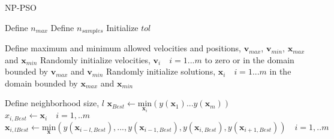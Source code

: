 \begin{breakablealgorithm}
\caption{NP-PSO}
\label{nppso_algorithm}
\begin{algorithmic}[1]
\State Define $n_{max}$ 
\State Define $n_{samples}$ 
\State Initialize $tol$  
\EndProcedure

\State Define maximum and minimum allowed velocities and positions, $\mathbf{v}_{max}$, $\mathbf{v}_{min}$, $\mathbf{x}_{max}$ and $\mathbf{x}_{min}$
\State Randomly initialize velocities, $\mathbf{v}_i \quad i=1...m$ to zero or in the domain bounded by $\mathbf{v}_{max}$ and $\mathbf{v}_{min}$
\State Randomly initialize solutions, $\mathbf{x}_i \quad i=1...m$ in the domain bounded by $\mathbf{x}_{max}$ and $\mathbf{x}_{min}$
\EndProcedure

\State Define neighborhood size, $l$
\State $\mathbf{x}_{Best} \leftarrow \underset{\mathbf{x}_i}{\textrm{min}}(y(\mathbf{x}_1)...y(\mathbf{x}_m))$
\State $x_{i,Best} \leftarrow \mathbf{x}_i \quad i=1,..m$
\State $\mathbf{x}_{i,lBest} \leftarrow \underset{\mathbf{x}}{\textrm{min}}(y(\mathbf{x}_{i-l,Best}),...,y(\mathbf{x}_{i-1,Best}),y(\mathbf{x}_{i,Best}),y(\mathbf{x}_{i+1,Best}))  \quad i=1,..m$
\EndProcedure


\end{algorithmic}
\end{breakablealgorithm}
